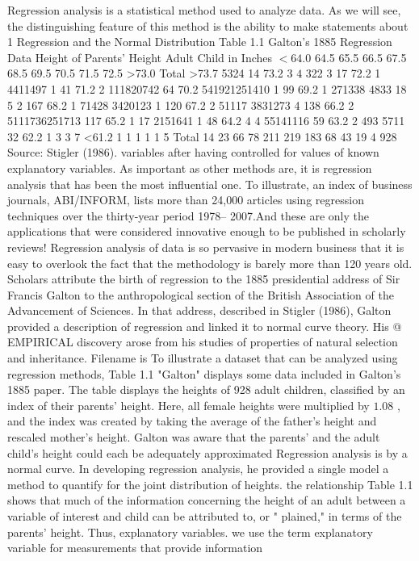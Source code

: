 \documentclass[11pt]{article}
\begin{document}
Regression analysis is a statistical method used to analyze data. As we will see,
 the distinguishing feature of this method is the ability to make statements about
1
 Regression and the Normal Distribution
Table 1.1 Galton's
1885 Regression Data Height of Parents' Height
Adult Child
in Inches \(< 6 4 . 0\) 64.5 65.5 66.5 67.5 68.5 69.5 70.5 71.5 72.5 >73.0 Total
>73.7 5324 14
73.2 3 \(4\) 322 3 17
72.2 1 4411497 1 41
71.2 2 111820742 64
70.2 541921251410 1 99
69.2 1 271338 4833 18 5 2 167
68.2 1 71428 3420123 1 120
67.2 2 51117 3831273 4 138
66.2 2 5111736251713 117
65.2 1 17 2151641 1 48
64.2 4 4 55141116 59
63.2 2 493 5711 32
62.2 1 3 3 7
<61.2 1 1 1 1 1 5
Total 14 23 66 78 211 219 183 68 43 19 4 928
Source: Stigler (1986).
variables after having controlled for values of known explanatory variables. As
important as other methods are, it is regression analysis that has been the most
 influential one. To illustrate, an index of business journals, ABI/INFORM, lists
 more than 24,000 articles using regression techniques over the thirty-year period
1978-- 2007.And these are only the applications that were considered innovative
enough to be published in scholarly reviews!
 Regression analysis of data is so pervasive in modern business that it is easy
to overlook the fact that the methodology is barely more than 120 years old.
Scholars attribute the birth of regression to the 1885 presidential address of Sir
Francis Galton to the anthropological section of the British Association of the
Advancement of Sciences. In that address, described in Stigler (1986), Galton
provided a description of regression and linked it to normal curve theory. His
@ EMPIRICAL discovery arose from his studies of properties of natural selection and inheritance.
 Filename is To illustrate a dataset that can be analyzed using regression methods, Table 1.1
"Galton" displays some data included in Galton's 1885 paper. The table displays the heights
of 928 adult children, classified by an index of their parents' height. Here, all
female heights were multiplied by \(1 . 0 8\) , and the index was created by taking the
 average of the father's height and rescaled mother's height. Galton was aware that
the parents' and the adult child's height could each be adequately approximated
Regression analysis is by a normal curve. In developing regression analysis, he provided a single model
 a method to quantify for the joint distribution of heights.
 the relationship Table 1.1 shows that much of the information concerning the height of an adult
 between a variable of
interest and child can be attributed to, or " plained," in terms of the parents' height. Thus,
 explanatory variables. we use the term explanatory variable for measurements that provide information
\clearpage
\end{document}
